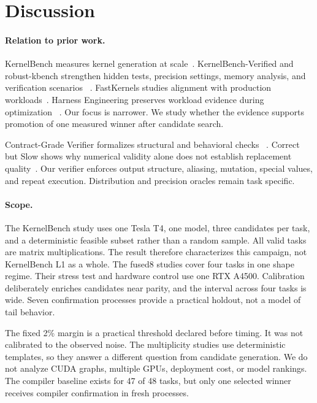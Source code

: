 \section{Discussion}

\paragraph{Relation to prior work.}
KernelBench measures kernel generation at scale~\citep{kernelbench2025}.
KernelBench-Verified and robust-kbench strengthen hidden tests, precision
settings, memory analysis, and verification scenarios
~\citep{zhang2026kernelbenchverified,lange2025robustkbench}. FastKernels studies
alignment with production workloads~\citep{oliaro2026fastkernels}. Harness
Engineering preserves workload evidence during optimization
~\citep{shui2026harness}. Our focus is narrower. We study whether the evidence
supports promotion of one measured winner after candidate search.

Contract-Grade Verifier formalizes structural and behavioral checks
~\citep{shah2026contractgrade}. Correct but Slow shows why numerical validity
alone does not establish replacement quality~\citep{li2026correctslow}. Our
verifier enforces output structure, aliasing, mutation, special values, and
repeat execution. Distribution and precision oracles remain task specific.

\paragraph{Scope.}
The KernelBench study uses one Tesla T4, one model, three candidates per task,
and a deterministic feasible subset rather than a random sample. All valid tasks
are matrix multiplications. The result therefore characterizes this campaign,
not KernelBench L1 as a whole. The fused8 studies cover four tasks in one shape
regime. Their stress test and hardware control use one RTX A4500. Calibration
deliberately enriches candidates near parity, and the interval across four tasks
is wide. Seven confirmation processes provide a practical holdout, not a model
of tail behavior.

The fixed 2\% margin is a practical threshold declared before timing. It was not
calibrated to the observed noise. The multiplicity studies use deterministic
templates, so they answer a different question from candidate generation. We do
not analyze CUDA graphs, multiple GPUs, deployment cost, or model rankings. The
compiler baseline exists for 47 of 48 tasks, but only one selected winner receives
compiler confirmation in fresh processes.

